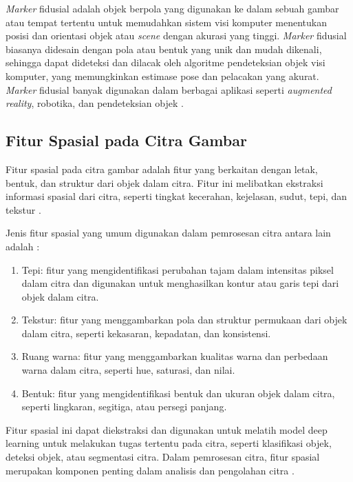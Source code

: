 \emph{Marker} fidusial adalah objek berpola yang digunakan ke dalam sebuah gambar atau tempat tertentu untuk memudahkan sistem visi komputer menentukan posisi dan orientasi objek atau \emph{scene} dengan akurasi yang tinggi. \emph{Marker} fidusial biasanya didesain dengan pola atau bentuk yang unik dan mudah dikenali, sehingga dapat dideteksi dan dilacak oleh algoritme pendeteksian objek visi komputer, yang memungkinkan estimase pose dan pelacakan yang akurat. \emph{Marker} fidusial banyak digunakan dalam berbagai aplikasi seperti \emph{augmented reality}, robotika, dan pendeteksian objek \cite{arucoopencv}.

\subsection{Fitur Spasial pada Citra Gambar}
Fitur spasial pada citra gambar adalah fitur yang berkaitan dengan letak, bentuk, dan struktur dari objek dalam citra. Fitur ini melibatkan ekstraksi informasi
spasial dari citra, seperti tingkat kecerahan, kejelasan, sudut, tepi, dan tekstur \cite{Gonzalez2009}.

Jenis fitur spasial yang umum digunakan dalam pemrosesan citra antara lain adalah \cite{Gonzalez2009}:

\begin{enumerate}
	\item Tepi: fitur yang mengidentifikasi perubahan tajam dalam intensitas piksel dalam citra dan digunakan untuk menghasilkan kontur atau garis tepi dari objek dalam
	      citra.
	\item Tekstur: fitur yang menggambarkan pola dan struktur permukaan dari objek dalam citra, seperti kekasaran, kepadatan, dan konsistensi.
	\item Ruang warna: fitur yang menggambarkan kualitas warna dan perbedaan warna dalam citra, seperti hue, saturasi, dan nilai.
	\item Bentuk: fitur yang mengidentifikasi bentuk dan ukuran objek dalam citra, seperti lingkaran, segitiga, atau persegi panjang.
\end{enumerate}

Fitur spasial ini dapat diekstraksi dan digunakan untuk melatih model deep learning untuk melakukan tugas tertentu pada citra, seperti klasifikasi objek,
deteksi objek, atau segmentasi citra. Dalam pemrosesan citra, fitur spasial merupakan komponen penting dalam analisis dan pengolahan citra \cite{Gonzalez2009}.

